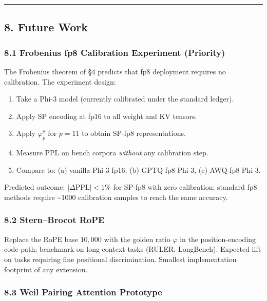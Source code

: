 \documentclass[
  11pt,
]{article}
\providecommand{\tightlist}{%
  \setlength{\itemsep}{0pt}\setlength{\parskip}{0pt}}
\begin{document}
\begin{center}\rule{0.5\linewidth}{0.5pt}\end{center}

\hypertarget{future-work}{%
\subsection{8. Future Work}\label{future-work}}

\hypertarget{frobenius-fp8-calibration-experiment-priority}{%
\subsubsection{8.1 Frobenius fp8 Calibration Experiment
(Priority)}\label{frobenius-fp8-calibration-experiment-priority}}

The Frobenius theorem of §4 predicts that fp8 deployment requires no
calibration. The experiment design:

\begin{enumerate}
\def\labelenumi{\arabic{enumi}.}
\tightlist
\item
  Take a Phi-3 model (currently calibrated under the standard ledger).
\item
  Apply SP encoding at fp16 to all weight and KV tensors.
\item
  Apply \(\varphi_p^8\) for \(p = 11\) to obtain SP-fp8 representations.
\item
  Measure PPL on bench corpora \emph{without} any calibration step.
\item
  Compare to: (a) vanilla Phi-3 fp16, (b) GPTQ-fp8 Phi-3, (c) AWQ-fp8
  Phi-3.
\end{enumerate}

Predicted outcome: \(|\Delta\mathrm{PPL}| < 1\%\) for SP-fp8 with zero
calibration; standard fp8 methods require \textasciitilde1000
calibration samples to reach the same accuracy.

\hypertarget{sternbrocot-rope}{%
\subsubsection{8.2 Stern--Brocot RoPE}\label{sternbrocot-rope}}

Replace the RoPE base \(10{,}000\) with the golden ratio \(\varphi\) in
the position-encoding code path; benchmark on long-context tasks (RULER,
LongBench). Expected lift on tasks requiring fine positional
discrimination. Smallest implementation footprint of any extension.

\hypertarget{weil-pairing-attention-prototype}{%
\subsubsection{8.3 Weil Pairing Attention
Prototype}\label{weil-pairing-attention-prototype}}
\end{document}
